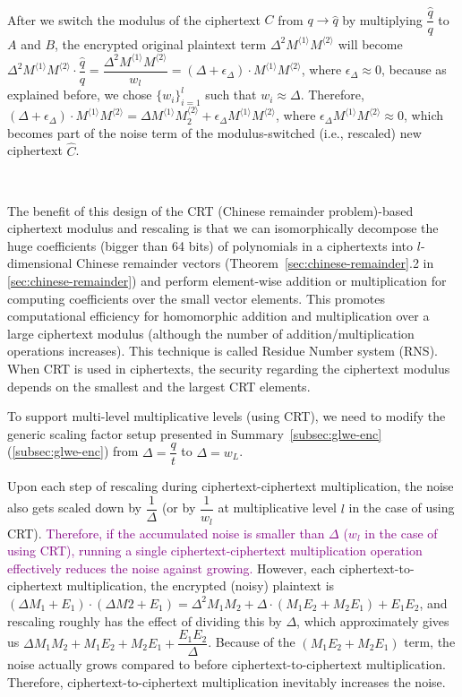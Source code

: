 $ $

After we switch the modulus of the ciphertext $C$ from $q \rightarrow \hat{q}$ by multiplying $\dfrac{\hat{q}}{q}$ to $A$ and $B$, the encrypted original plaintext term $\Delta^2 M^{\langle 1 \rangle} M^{\langle 2 \rangle}$ will become $\Delta^2 M^{\langle 1 \rangle} M^{\langle 2 \rangle} \cdot \dfrac{\hat{q}}{q} = \dfrac{\Delta^2 M^{\langle 1 \rangle} M^{\langle 2 \rangle}}{w_l} = (\Delta + \epsilon_\Delta)\cdot M^{\langle 1 \rangle} M^{\langle 2 \rangle}$, where $\epsilon_\Delta \approx 0$, because as explained before, we chose $\{w_i\}_{i=1}^{l}$ such that $w_i \approx \Delta$. Therefore, $(\Delta + \epsilon_\Delta)\cdot M^{\langle 1 \rangle} M^{\langle 2 \rangle} = \Delta M^{\langle 1 \rangle} M_2^{\langle 2 \rangle} + \epsilon_\Delta M^{\langle 1 \rangle} M^{\langle 2 \rangle}$, where $\epsilon_\Delta M^{\langle 1 \rangle} M^{\langle 2 \rangle} \approx 0$, which becomes part of the noise term of the modulus-switched (i.e., rescaled) new ciphertext $\hat{C}$. 

$ $

The benefit of this design of the CRT (Chinese remainder problem)-based ciphertext modulus and rescaling is that we can isomorphically decompose the huge coefficients (bigger than 64 bits) of polynomials in a ciphertexts into $l$-dimensional Chinese remainder vectors (Theorem~\ref{sec:chinese-remainder}.2 in \autoref{sec:chinese-remainder}) and perform element-wise addition or multiplication for computing coefficients over the small vector elements. This promotes computational efficiency for homomorphic addition and multiplication over a large ciphertext modulus (although the number of addition/multiplication operations increases). This technique is called Residue Number system (RNS). When CRT is used in ciphertexts, the security regarding the ciphertext modulus depends on the smallest and the largest CRT elements. 

 To support multi-level multiplicative levels (using CRT), we need to modify the generic scaling factor setup presented in Summary~\ref*{subsec:glwe-enc} (\autoref{subsec:glwe-enc}) from $\Delta = \dfrac{q}{t}$ to $\Delta = w_L$. 

 Upon each step of rescaling during ciphertext-ciphertext multiplication, the noise also gets scaled down by $\dfrac{1}{\Delta}$ (or by $\dfrac{1}{w_l}$ at multiplicative level $l$ in the case of using CRT). \textcolor{purple}{Therefore, if the accumulated noise is smaller than $\Delta$ ($w_l$ in the case of using CRT), running a single ciphertext-ciphertext multiplication operation effectively reduces the noise against growing.} However, each ciphertext-to-ciphertext multiplication, the encrypted (noisy) plaintext is $(\Delta M_1 + E_1)\cdot(\Delta M2 + E_1) = \Delta^2 M_1 M_2 + \Delta\cdot (M_1E_2 + M_2E_1) + E_1E_2$, and rescaling roughly has the effect of dividing this by $\Delta$, which approximately gives us $\Delta M_1 M_2 + M_1E_2 + M_2E_1 + \dfrac{E_1E_2}{\Delta}$. Because of the $(M_1E_2 + M_2E_1)$ term, the noise actually grows compared to before ciphertext-to-ciphertext multiplication. Therefore, ciphertext-to-ciphertext multiplication inevitably increases the noise. 

